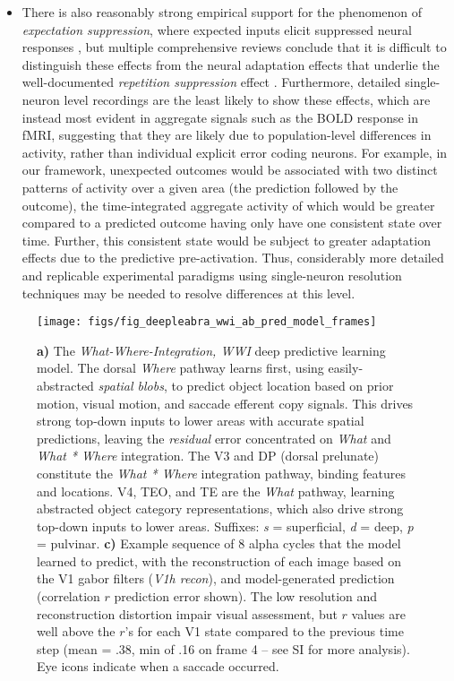 \documentclass[11pt,twoside]{article}
\newif\myifpdf
\begin{document}
\begin{itemize}
	\item There is also reasonably strong empirical support for the phenomenon of \emph{expectation suppression}, where expected inputs elicit suppressed neural responses \cite{SummerfieldTrittschuhMontiEtAl08,TodorovicEdeMarisEtAl11,MeyerOlson11,BastosUsreyAdamsEtAl12}, but multiple comprehensive reviews conclude that it is difficult to distinguish these effects from the neural adaptation effects that underlie the well-documented \emph{repetition suppression} effect \cite{WalshMcGovernClarkEtAl20,VinkenVogels17,KokJeheedeLange12,LeeMumford03}.  Furthermore, detailed single-neuron level recordings are the least likely to show these effects, which are instead most evident in aggregate signals such as the BOLD response in fMRI, suggesting that they are likely due to population-level differences in activity, rather than individual explicit error coding neurons.  For example, in our framework, unexpected outcomes would be associated with two distinct patterns of activity over a given area (the prediction followed by the outcome), the time-integrated aggregate activity of which would be greater compared to a predicted outcome having only have one consistent state over time.  Further, this consistent state would be subject to greater adaptation effects due to the predictive pre-activation.  Thus, considerably more detailed and replicable experimental paradigms using single-neuron resolution techniques may be needed to resolve differences at this level.
\end{itemize}

\begin{figure}
  \centering\texttt{[image: figs/fig\_deepleabra\_wwi\_ab\_pred\_model\_frames]}
  \caption{{\bf a)} The \emph{What-Where-Integration, WWI} deep predictive learning model. The dorsal \emph{Where} pathway learns first, using easily-abstracted \emph{spatial blobs}, to predict object location based on prior motion, visual motion, and saccade efferent copy signals.  This drives strong top-down inputs to lower areas with accurate spatial predictions, leaving the \emph{residual} error concentrated on \emph{What} and \emph{What * Where} integration.  The V3 and DP (dorsal prelunate) constitute the \emph{What * Where} integration pathway, binding features and locations.  V4, TEO, and TE are the \emph{What} pathway, learning abstracted object category representations, which also drive strong top-down inputs to lower areas.  Suffixes: \emph{s} = superficial, \emph{d} = deep, \emph{p} = pulvinar. {\bf c)} Example sequence of 8 alpha cycles that the model learned to predict, with the reconstruction of each image based on the V1 gabor filters (\emph{V1h recon}), and model-generated prediction (correlation $r$ prediction error shown).  The low resolution and reconstruction distortion impair visual assessment, but $r$ values are well above the $r$'s for each V1 state compared to the previous time step (mean = .38, min of .16 on frame 4 -- see SI for more analysis).  Eye icons indicate when a saccade occurred.}
  \label{fig.model}
\end{figure}
\end{document}
